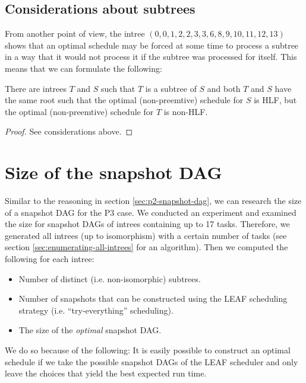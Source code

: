 \subsection{Considerations about subtrees}
\label{sec:properties-optimal-schedules-no-implications}

From another point of view, the intree $(0,0,1,2,2,3,3,6,8,9,10,11,12,13)$ shows that an optimal schedule may be forced at some time to process a subtree in a way that it would not process it if the subtree was processed for itself. This means that we can formulate the following:

\begin{theorem}
  There are intrees $T$ and $S$ such that $T$ is a subtree of $S$ and both $T$ and $S$ have the same root such that the optimal (non-preemtive) schedule for $S$ is HLF, but the optimal (non-preemtive) schedule for $T$ is non-HLF.
\end{theorem}

\begin{proof}
  See considerations above.
\end{proof}

\section{Size of the snapshot DAG}
\label{sec:p3-size-of-snapshot-dag-first-attempts}

Similar to the reasoning in section \ref{sec:p2-snapshot-dag}, we can research the size of a snapshot DAG for the P3 case. 
We conducted an experiment and examined the size for snapshot DAGs of intrees containing up to 17 tasks. 
Therefore, we generated all intrees (up to isomorphism) with a certain number of tasks (see section \ref{sec:enumerating-all-intrees} for an algorithm).
Then we computed the following for each intree:
\begin{itemize}
\item Number of distinct (i.e. non-isomorphic) subtrees.
\item Number of snapshots that can be constructed using the LEAF scheduling strategy (i.e. ``try-everything'' scheduling).
\item The size of the \emph{optimal} snapshot DAG.
\end{itemize}

We do so because of the following: It is easily possible to construct an optimal schedule if we take the possible snapshot DAGs of the LEAF scheduler and only leave the choices that yield the best expected run time.

